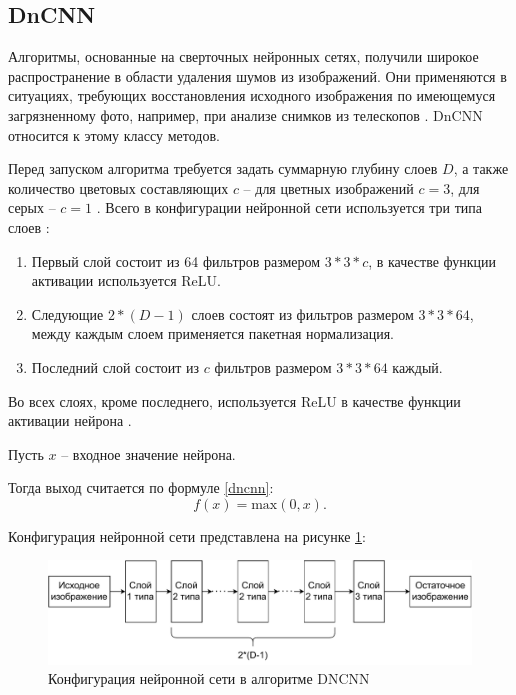 \subsection{DnCNN}
Алгоритмы, основанные на сверточных нейронных сетях, получили широкое распространение в области удаления шумов из изображений.
Они применяются в ситуациях, требующих восстановления исходного изображения по имеющемуся загрязненному фото, например, при анализе снимков из телескопов \cite{neural}. 
DnCNN относится к этому классу методов.

Перед запуском алгоритма требуется задать суммарную глубину слоев $D$, а также количество цветовых составляющих $c$ -- для цветных изображений $c=3$, для серых -- $c=1$ \cite{dcnn}. Всего в конфигурации нейронной сети используется три типа слоев \cite{dcnn2}:
\begin{enumerate}
	\item Первый слой состоит из 64 фильтров размером $3*3*c$, в качестве функции активации используется ReLU.
	\item Следующие $2*(D - 1)$ слоев состоят из фильтров размером $3*3*64$, между каждым слоем применяется пакетная нормализация.
	\item Последний слой состоит из $c$ фильтров размером $3*3*64$ каждый.
\end{enumerate}

Во всех слоях, кроме последнего, используется ReLU в качестве функции активации нейрона \cite{dcnn}. 

Пусть $x$ -- входное значение нейрона. 

Тогда выход считается по формуле \eqref{dncnn}: 
\begin{equation}
	\label{dncnn}
	f(x) = \mathrm{max}(0, x).
\end{equation}

Конфигурация нейронной сети представлена на рисунке \ref{fig::dncnn}:
\FloatBarrier
\begin{figure}[h]	
	\begin{center}
		\includegraphics[width=\linewidth]{inc/pdf/dnn.pdf}
	\end{center}
	\captionsetup{justification=centering}
	\caption{Конфигурация нейронной сети в алгоритме DNCNN}
	\label{fig::dncnn}
\end{figure}
\FloatBarrier

